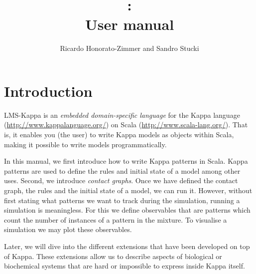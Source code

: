 \documentclass{article}
\title{\lmsk: \\ User manual}
\author{Ricardo Honorato-Zimmer and Sandro Stucki}
\newcommand{\kpp}{Kappa\xspace}
\newcommand{\lms}{LMS\xspace}
\newcommand{\lmsk}{\lms-\kpp}
\begin{document}
\maketitle

\section{Introduction}
\lmsk is an \emph{embedded domain-specific language} for the
\kpp language (\url{http://www.kappalanguage.org/}) on Scala
(\url{http://www.scala-lang.org/}).  That is, it enables you
(the user) to write \kpp models as objects within Scala, making
it possible to write models programmatically.

In this manual, we first introduce how to write \kpp patterns in
Scala.  \kpp patterns are used to define the rules and initial state
of a model among other uses.  Second, we introduce \emph{contact graphs}.
Once we have defined the contact graph, the rules and the initial
state of a model, we can run it.  However, without first stating what
patterns we want to track during the simulation, running a simulation
is meaningless.  For this we define observables that are patterns
which count the number of instances of a pattern in the mixture.
To visualise a simulation we may plot these observables.

Later, we will dive into the different extensions that have been
developed on top of \kpp.  These extensions allow us to describe aspects
of biological or biochemical systems that are hard or impossible to
express inside \kpp itself.
\end{document}
